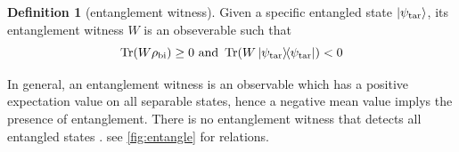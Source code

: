 \documentclass[
reprint,
aps,
pra,
floatfix,
]{revtex4-2}
\theoremstyle{plain}
\theoremstyle{definition}
\newtheorem{definition}{Definition}
\newcommand{\ew}{W}
\newcommand{\ob}{O}
\newcommand{\dm}{\rho}
\newcommand{\bi}{\text{bi}}
\newcommand{\target}{\textup{tar}}
\begin{document}

\begin{definition}[entanglement witness]\label{def:entanglement_witness}
	Given a specific entangled state $\ket{\psi_\target}$, its entanglement witness $\ew$ is an obseverable such that
	\begin{equation}
		\Tr(\ew\dm_{\bi}) \ge 0  \text{ and }
		\Tr(\ew\op{\psi_{\target}}) < 0 
	\end{equation}
\end{definition}
	In general, an entanglement witness is an observable which has a positive expectation value on all separable states, hence a negative mean value implys the presence of entanglement.
There is no entanglement witness that detects all entangled states \cite{heinosaariMathematicalLanguageQuantum2011}.
see \cref{fig:entangle} for relations.
\end{document}
